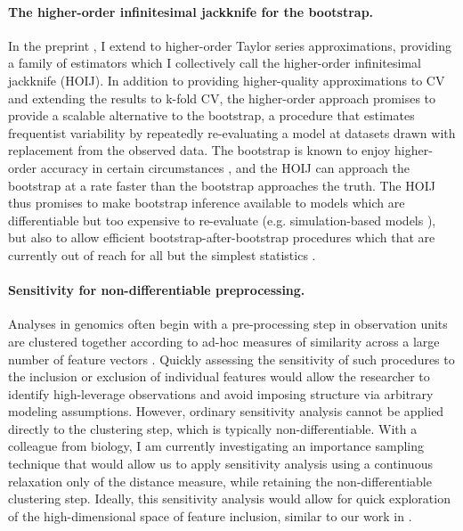 \paragraph{The higher-order infinitesimal jackknife for the bootstrap.}

In the preprint \citet{giordano2019:hoij}, I extend \citet{giordano:2019:ij} to
higher-order Taylor series approximations, providing a family of estimators
which I collectively call the higher-order infinitesimal jackknife (HOIJ).  In
addition to providing higher-quality approximations to CV and extending the
results to k-fold CV, the higher-order approach promises to provide a scalable
alternative to the bootstrap, a procedure that estimates frequentist variability
by repeatedly re-evaluating a model at datasets drawn with replacement from the
observed data. The bootstrap is known to enjoy higher-order accuracy in certain
circumstances \citet{hall:2013:bootstrap}, and the HOIJ can approach the
bootstrap at a rate faster than the bootstrap approaches the truth.  The HOIJ
thus promises to make bootstrap inference available to models which are
differentiable but too expensive to re-evaluate (e.g. simulation-based models
\citep[Section 2.6]{baker:2019:workshop}), but also to allow efficient
bootstrap-after-bootstrap procedures which that are currently out of reach for
all but the simplest statistics \citep{efron:1994:bootstrap}.


\paragraph{Sensitivity for non-differentiable preprocessing.}

Analyses in genomics often begin with a pre-processing step in observation units
are clustered together according to ad-hoc measures of similarity across a large
number of feature vectors \citep{xu:2015:identification,
stuart:2019:comprehensive}.  Quickly assessing the sensitivity of such
procedures to the inclusion or exclusion of individual features would allow the
researcher to identify high-leverage observations and avoid imposing structure
via arbitrary modeling assumptions.  However, ordinary sensitivity analysis
cannot be applied directly to the clustering step, which is typically
non-differentiable.  With a colleague from biology, I am currently investigating
an importance sampling technique that would allow us to apply sensitivity
analysis using a continuous relaxation only of the distance measure, while
retaining the non-differentiable clustering step. Ideally, this sensitivity
analysis would allow for quick exploration of the high-dimensional space of
feature inclusion, similar to our work in \citet{giordano:2020:amip}.

